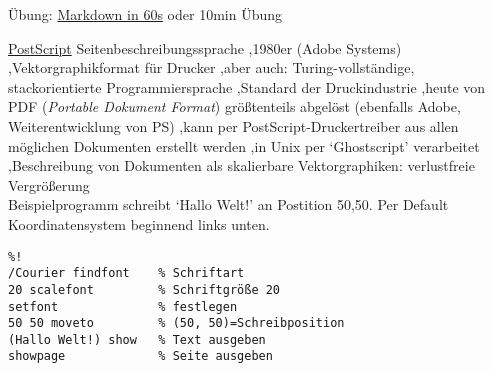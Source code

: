 \begin{frame}[standout]
  Übung: \alert{\href{https://commonmark.org/help}{Markdown in 60s}} oder 10min Übung
\end{frame}




\begin{frame}{\href{https://de.wikipedia.org/wiki/PostScript}{PostScript}}
Seitenbeschreibungssprache \sep 1980er (Adobe Systems) \sep Vektorgraphikformat für Drucker \sep aber auch: Turing-vollständige, stackorientierte Programmiersprache \sep Standard der Druckindustrie \sep heute von PDF (\emph{Portable Dokument Format}) größtenteils abgelöst (ebenfalls Adobe, Weiterentwicklung von PS) \sep kann per PostScript-Druckertreiber aus allen möglichen Dokumenten erstellt werden \sep in Unix per `Ghostscript' verarbeitet \sep Beschreibung von Dokumenten als skalierbare Vektorgraphiken: verlustfreie Vergrößerung 
~\\[0.2em]
\footnotesize
Beispielprogramm schreibt `Hallo Welt!' an Postition 50,50. Per Default Koordinatensystem beginnend links unten.
\begin{verbatim}
%!
/Courier findfont    % Schriftart
20 scalefont         % Schriftgröße 20 
setfont              % festlegen
50 50 moveto         % (50, 50)=Schreibposition
(Hallo Welt!) show   % Text ausgeben
showpage             % Seite ausgeben
\end{verbatim}
\normalsize

\end{frame}


